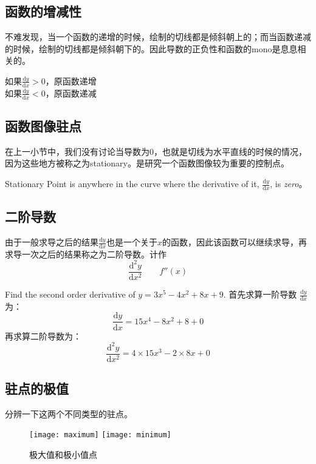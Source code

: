 \subsection*{函数的增减性}
不难发现，当一个函数的递增的时候，绘制的切线都是倾斜朝上的；而当函数递减的时候，绘制的切线都是倾斜朝下的。因此导数的正负性和函数的\gls{mono}是息息相关的。

\begin{SummBox}
如果$\frac{\mathrm{d} y}{\mathrm{d} x} > 0$，原函数递增\\
如果$\frac{\mathrm{d} y}{\mathrm{d} x} < 0$，原函数递减
\end{SummBox}

\subsection*{函数图像驻点}
在上一小节中，我们没有讨论当导数为$0$，也就是切线为水平直线的时候的情况，因为这些地方被称之为\gls{stationary}。是研究一个函数图像较为重要的控制点。

\begin{definition}
Stationary Point is anywhere in the curve where the derivative of it, $\frac{\mathrm{d} y}{\mathrm{d} x}$, is \emph{zero}。 
\end{definition}

\subsection*{二阶导数}
由于一般求导之后的结果$\frac{\mathrm{d} y}{\mathrm{d} x}$也是一个关于$x$的函数，因此该函数可以继续求导，再求导一次之后的结果称之为二阶导数。计作
\[
	\frac{\mathrm{d}^2 y}{\mathrm{d} x^2} \qquad f''(x)
\]

\begin{ExampleBox}
Find the second order derivative of $y=3x^5-4x^2+8x+9$.
\tcblower
首先求算一阶导数 $\frac{\mathrm{d} y}{\mathrm{d} x}$为：
\[
	\frac{\mathrm{d} y}{\mathrm{d} x}=15x^4-8x^2+8+0
\]
再求算二阶导数为：
\[
	\frac{\mathrm{d}^2 y}{\mathrm{d} x^2}=4\times 15x^3-2\times 8x+0
\]
\end{ExampleBox}


\subsection*{驻点的极值}
分辨一下这两个不同类型的驻点。
\begin{figure}[H]
\centering
\texttt{[image: maximum]}
\texttt{[image: minimum]}
\caption{极大值和极小值点}
\end{figure}

